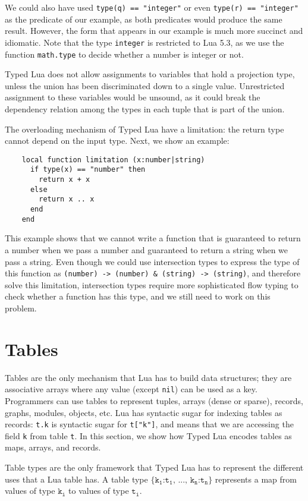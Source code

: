 We could also have used \texttt{type(q) == "integer"} or
even \texttt{type(r) == "integer"} as the predicate of our example,
as both predicates would produce the same result.
However, the form that appears in our example is much more succinct and idiomatic.
Note that the type \texttt{integer} is restricted to Lua 5.3,
as we use the function \texttt{math.type} to decide whether a number
is integer or not.

Typed Lua does not allow assignments to variables that hold a projection type,
unless the union has been discriminated down to a single value.
Unrestricted assignment to these variables would be unsound,
as it could break the dependency relation among the types in each tuple
that is part of the union.

The overloading mechanism of Typed Lua have a limitation:
the return type cannot depend on the input type.
Next, we show an example:
\begin{verbatim}
    local function limitation (x:number|string)
      if type(x) == "number" then
        return x + x
      else
        return x .. x
      end
    end
\end{verbatim}

This example shows that we cannot write a function that is
guaranteed to return a number when we pass a number and
guaranteed to return a string when we pass a string.
Even though we could use intersection types to express the type
of this function as
\texttt{(number) -> (number) \string&
(string) -> (string)},
and therefore solve this limitation,
intersection types require more sophisticated flow typing to
check whether a function has this type,
and we still need to work on this problem.

\section{Tables}
\label{sec:tables}

Tables are the only mechanism that Lua has to build data structures;
they are associative arrays where any value (except \texttt{nil})
can be used as a key.
Programmers can use tables to represent tuples, arrays (dense or sparse),
records, graphs, modules, objects, etc.
Lua has syntactic sugar for indexing tables as records:
\texttt{t.k} is syntactic sugar for \texttt{t["k"]}, and means that
we are accessing the field \texttt{k} from table \texttt{t}. 
In this section, we show how Typed Lua encodes tables as maps,
arrays, and records.

Table types are the only framework that Typed Lua has to represent
the different uses that a Lua table has.
A table type $\texttt{\{k}{_\texttt{1}}\texttt{:t}_{\texttt{1}}
\texttt{, ..., k}{_\texttt{n}}\texttt{:t}_{\texttt{n}}\texttt{\}}$ represents a map
from values of type $\texttt{k}_{\texttt{i}}$ to values of type
$\texttt{t}_{\texttt{i}}$.

